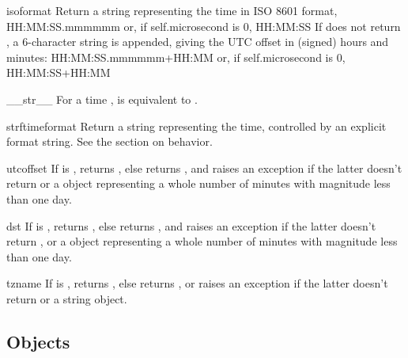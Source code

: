 \begin{methoddesc}{isoformat}{}
  Return a string representing the time in ISO 8601 format,
      HH:MM:SS.mmmmmm
  or, if self.microsecond is 0,
      HH:MM:SS
  If  does not return , a 6-character
  string is appended, giving the UTC offset in (signed) hours and
  minutes:
      HH:MM:SS.mmmmmm+HH:MM
  or, if self.microsecond is 0,
      HH:MM:SS+HH:MM
\end{methoddesc}

\begin{methoddesc}{__str__}{}
  For a time ,  is equivalent to
  .
\end{methoddesc}

\begin{methoddesc}{strftime}{format}
  Return a string representing the time, controlled by an explicit
  format string.  See the section on  behavior.
\end{methoddesc}

\begin{methoddesc}{utcoffset}{}
  If  is , returns , else
  returns , and
  raises an exception if the latter doesn't return  or
  a  object representing a whole number of minutes
  with magnitude less than one day.
\end{methoddesc}

\begin{methoddesc}{dst}{}
  If  is , returns , else
  returns , and
  raises an exception if the latter doesn't return , or
  a  object representing a whole number of minutes
  with magnitude less than one day.
\end{methoddesc}

\begin{methoddesc}{tzname}{}
  If  is , returns , else
  returns , or
  raises an exception if the latter doesn't return  or
  a string object.
\end{methoddesc}


\subsection{ Objects \label{datetime-tzinfo}}

